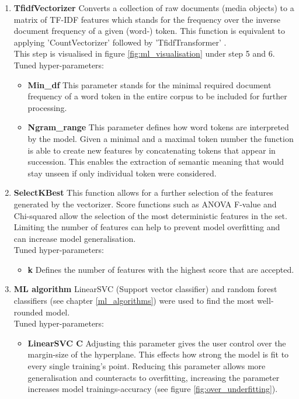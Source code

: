 \begin{enumerate}
    \item \textbf{TfidfVectorizer} Converts a collection of raw documents (media objects) to a matrix of TF-IDF features which stands for the frequency over the inverse document frequency of a given (word-) token. This function is equivalent to applying 'CountVectorizer' followed by 'TfidfTransformer' \parencite{Scikit-learn2018}.\\
    This step is visualised in figure \ref{fig:ml_visualisation} under step 5 and 6.\\
    Tuned hyper-parameters:
    \begin{itemize}[label={}]
        \item \textbf{Min\_df} This parameter stands for the minimal required document frequency of a word token in the entire corpus to be included for further processing.
        \item \textbf{Ngram\_range} This parameter defines how word tokens are interpreted by the model. Given a minimal and a maximal token number the function is able to create new features by concatenating tokens that appear in succession. This enables the extraction of semantic meaning that would stay unseen if only individual token were considered.
    \end{itemize}
    
    \item \textbf{SelectKBest} This function allows for a further selection of the features generated by the vectorizer. Score functions such as ANOVA F-value and Chi-squared allow the selection of the most deterministic features in the set. Limiting the number of features can help to prevent model overfitting and can increase model generalisation.\\
    Tuned hyper-parameters:
    \begin{itemize}[label={}]
        \item \textbf{k} Defines the number of features with the highest score that are accepted.
    \end{itemize}
    
    \item \textbf{ML algorithm} LinearSVC (Support vector classifier) and random forest classifiers (see chapter \ref{ml_algorithms}) were used to find the most well-rounded model.\\
    Tuned hyper-parameters:
    \begin{itemize}[label={}]
        \item \textbf{LinearSVC C} Adjusting this parameter gives the user control over the margin-size of the hyperplane. This effects how strong the model is fit to every single training's point. Reducing this parameter allows more generalisation and counteracts to overfitting, increasing the parameter increases model trainings-accuracy (see figure \ref{fig:over_underfitting}).
        

\end{itemize}
\end{enumerate}

